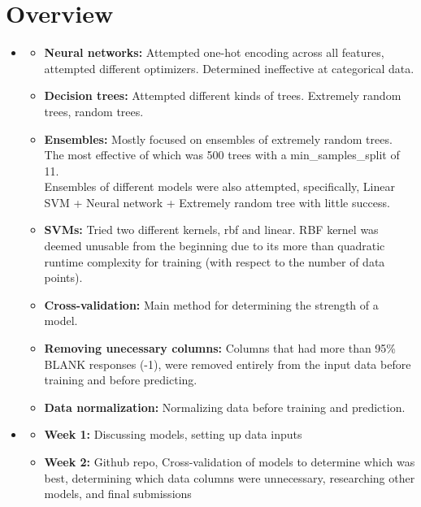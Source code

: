 \section{Overview}
\medskip
\begin{itemize}

    \item {}
    \begin{itemize}
    \item \textbf{Neural networks:} Attempted one-hot encoding across all
        features, attempted different optimizers. Determined ineffective at
        categorical data.
    \item \textbf{Decision trees:} Attempted different kinds of trees. Extremely
        random trees, random trees.
    \item \textbf{Ensembles:}
        Mostly focused on ensembles of extremely random trees. The most effective
        of which was 500 trees with a min_samples_split of 11.
        \\
        Ensembles of different models were also attempted, specifically,
        Linear SVM + Neural network + Extremely random tree with little
        success.
    \item \textbf{SVMs:}
        Tried two different kernels, rbf and linear. RBF kernel was deemed
        unusable from the beginning due to its more than quadratic runtime
        complexity for training (with respect to the number of data points).
    \item \textbf{Cross-validation:}
        Main method for determining the strength of a model.
    \item \textbf{Removing unecessary columns:}
        Columns that had more than 95\% BLANK responses (-1), were removed
        entirely from the input data before training and before predicting.
    \item \textbf{Data normalization:}
        Normalizing data before training and prediction.
    \end{itemize}

    \item {}
    \begin{itemize}
    \item \textbf{Week 1:} Discussing models, setting up data inputs
    \item \textbf{Week 2:} Github repo, Cross-validation of models to determine which was best, determining which data columns were unnecessary, researching other models, and final submissions
    \end{itemize}

\end{itemize}

